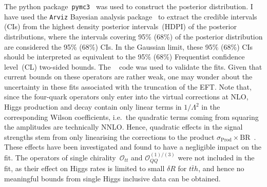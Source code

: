 	The python package~\texttt{pymc3}~\cite{Salvatier2016} was used to construct the posterior distribution. I have used the \texttt{Arviz} Bayesian analysis package~\cite{arviz_2019} to extract the credible intervals (CIs) from the highest density posterior intervals~(HDPI) of the posterior distributions, where the intervals covering 95\% (68\%) of the posterior distribution are considered the 95\% (68\%) CIs. In the Gaussian limit, these  95\% (68\%) CIs should be interpreted as equivalent to the 95\%  (68\%) Frequentist  confidence level~(CL) two-sided bounds. The \HEPfit~\cite{deBlas:2019okz} code was used to validate the fits.
	Given that current bounds on these operators are rather weak, one may wonder about the uncertainty in these fits associated with the truncation of the EFT.
	Note that, since the four-quark operators only enter into the virtual corrections at NLO, Higgs production and decay contain only linear terms in $1/\Lambda^{2}$ in the corresponding Wilson coefficients, i.e.~the quadratic terms coming from squaring the amplitudes are technically NNLO. 
	Hence, quadratic effects in the signal strengths stem from only linearising the corrections to the product $\sigma_\mathrm{ Prod} \times \mathrm{ BR}$~\!.  These effects have been investigated and found to have a negligible impact on the fit. 
	The operators of single chirality~$\mathcal O_{tt}$ and $\mathcal{O}_{QQ}^{(1)/(3)}$ were not included in the fit, as their effect on Higgs rates is limited to small $\delta R$ for $t\bar t h$, and hence no meaningful bounds from single Higgs inclusive data can be obtained.
	\newpage
	\begingroup
	 
	\endgroup
	\FloatBarrier
